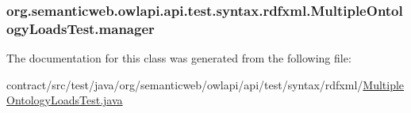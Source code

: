 \hypertarget{classorg_1_1semanticweb_1_1owlapi_1_1api_1_1test_1_1syntax_1_1rdfxml_1_1_multiple_ontology_loads_test_ae61a16527a997a49644c6532ee26359c}{
\subsubsection[{manager}]{ org.\-semanticweb.\-owlapi.\-api.\-test.\-syntax.\-rdfxml.\-Multiple\-Ontology\-Loads\-Test.\-manager\hspace{0.3cm}{\ttfamily [private]}}}\label{classorg_1_1semanticweb_1_1owlapi_1_1api_1_1test_1_1syntax_1_1rdfxml_1_1_multiple_ontology_loads_test_ae61a16527a997a49644c6532ee26359c}


The documentation for this class was generated from the following file\-:\begin{DoxyCompactItemize}
\item 
contract/src/test/java/org/semanticweb/owlapi/api/test/syntax/rdfxml/\hyperlink{_multiple_ontology_loads_test_8java}{Multiple\-Ontology\-Loads\-Test.\-java}\end{DoxyCompactItemize}
